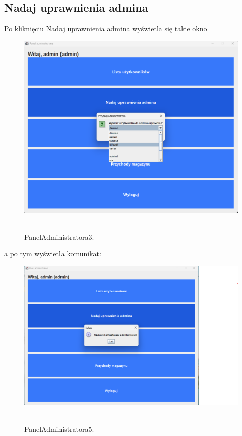 \subsection{Nadaj uprawnienia admina}
\label{subsec:Nadaj uprawnienia admina}
Po kliknięciu Nadaj uprawnienia admina wyświetla się takie okno 
\begin{figure}[H]
    \centering
    \includegraphics[width=.7\linewidth]{figures/PanelAdministratora3.png}\
    \caption{PanelAdministratora3.\label{PanelAdministratora3}}
\end{figure}
a po tym wyświetla komunikat:
\begin{figure}[H]
    \centering
    \includegraphics[width=.7\linewidth]{figures/PanelAdministratora5.png}\
    \caption{PanelAdministratora5.\label{PanelAdministratora5}}
\end{figure}
\clearpage
